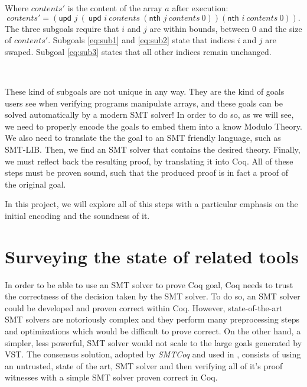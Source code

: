 \documentclass[onecolumn, preprint]{sigplanconf}
\newcommand{\nth}[3]{\textsf{nth } #1\ #2\ #3}
\newcommand{\unth}[3]{\textsf{upd } #1\ #2\ #3}
\begin{document}
Where $contents'$ is the content of the array $a$ after execution:
$$contents' = (\unth j (\unth{i}{contents} (\nth{j}{contents}{0})) (\nth{i}{contents}{0})).$$
The three subgoals require that $i$ and $j$ are within bounds, between 0 and the size of $contents'$. Subgoals \ref{eq:sub1} and \ref{eq:sub2} state that indices $i$ and $j$ are swaped.
Subgoal \ref{eq:sub3} states that all other indices remain unchanged.

\

These kind of subgoals are not unique in any way. They are the kind of goals users see when verifying programs manipulate arrays, and these goals can be solved automatically by a modern SMT solver! In order to do so, as we will see, we need to properly encode the goals to embed them into a know Modulo Theory. We also need to translate the the goal to an SMT friendly language, such as SMT-LIB. Then, we find an SMT solver that contains the desired theory. Finally, we must reflect back the resulting proof, by translating it into Coq. All of these steps must be proven sound, such that the produced proof is in fact a proof of the original goal. %

In this project, we will explore all of this steps with a particular emphasis on the initial encoding and the soundness of it.











\section{Surveying the state of related tools}
\label{sec:survey}


In order to be able to use an SMT solver to prove Coq goal, Coq needs to trust the correctness of the decision taken by the SMT solver. To do so, an SMT solver could be developed and proven correct within Coq. However, state-of-the-art SMT solvers are notoriously complex and they perform many preprocessing steps and optimizations which would be difficult to prove correct. On the other hand, a simpler, less powerful, SMT solver would not scale to the large goals generated by VST. The consensus solution, adopted by \emph{SMTCoq} \citep{keller13} and used in \cite{appelnote}, consists of using an untrusted, state of the art, SMT solver and then verifying all of it's proof witnesses with a simple SMT solver proven correct in Coq. 
\end{document}

